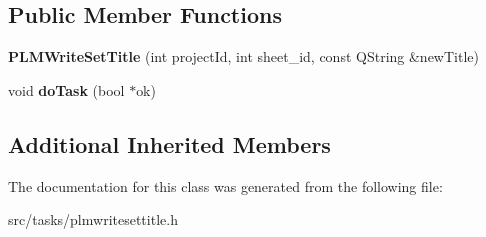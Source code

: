 \subsection*{Public Member Functions}
\begin{DoxyCompactItemize}
\item 
{\bfseries P\+L\+M\+Write\+Set\+Title} (int project\+Id, int sheet\+\_\+id, const Q\+String \&new\+Title)\hypertarget{class_p_l_m_write_set_title_a55dc60659dfeb575438a24fa4f8f0d00}{}\label{class_p_l_m_write_set_title_a55dc60659dfeb575438a24fa4f8f0d00}

\item 
void {\bfseries do\+Task} (bool $\ast$ok)\hypertarget{class_p_l_m_write_set_title_afbd40fd05d70d914a6b005a4cbb1ee55}{}\label{class_p_l_m_write_set_title_afbd40fd05d70d914a6b005a4cbb1ee55}

\end{DoxyCompactItemize}
\subsection*{Additional Inherited Members}


The documentation for this class was generated from the following file\+:\begin{DoxyCompactItemize}
\item 
src/tasks/plmwritesettitle.\+h\end{DoxyCompactItemize}
